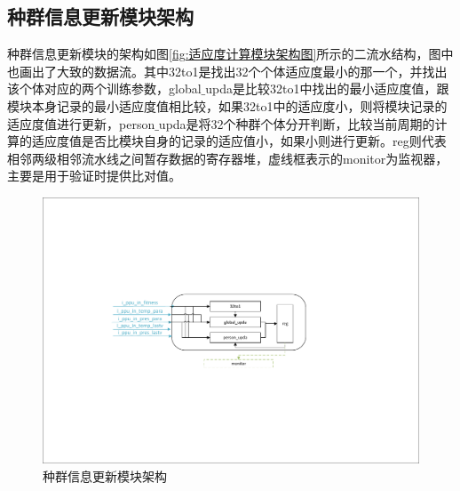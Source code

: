 \subsection{种群信息更新模块架构}
种群信息更新模块的架构如图\ref{fig:适应度计算模块架构图}所示的二流水结构，图中也画出了大致的数据流。其中32to1是找出32个个体适应度最小的那一个，并找出该个体对应的两个训练参数，global$\_$upda是比较32to1中找出的最小适应度值，跟模块本身记录的最小适应度值相比较，如果32to1中的适应度小，则将模块记录的适应度值进行更新，person$\_$upda是将32个种群个体分开判断，比较当前周期的计算的适应度值是否比模块自身的记录的适应值小，如果小则进行更新。reg则代表相邻两级相邻流水线之间暂存数据的寄存器堆，虚线框表示的monitor为监视器，主要是用于验证时提供比对值。

\begin{figure}[htb]
    \centering
    \includegraphics[width=14cm]{fig/5-fig/种群信息更新模块架构.pdf}
    \caption{种群信息更新模块架构}
    \label{fig:种群信息更新模块架构}
\end{figure}


